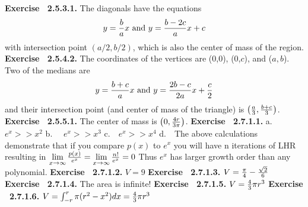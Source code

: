  {\noindent \protect \bf  Exercise ~2.5.3.1.} The diagonals have the equations $$ y=\protect \frac  {b}{a}x \protect \text  { and } y=\protect \frac  {b-2c}{a}x+c$$ with intersection point $(a/2,b/2)$, which is also the center of mass of the region. \protect \newline  \protect \newline  
 {\noindent \protect \bf  Exercise ~2.5.4.2.} The coordinates of the vertices are (0,0), (0,$c$), and ($a,b$). Two of the medians are $$y=\protect \frac  {b+c}{a}x \protect \text  { and } y=\protect \frac  {2b-c}{2a}x+\protect \frac  {c}{2}$$ and their intersection point (and center of mass of the triangle) is $\left (\protect \frac  {a}{3},\protect \frac  {b+c}{3}\right )$. \protect \newline  \protect \newline  
 {\noindent \protect \bf  Exercise ~2.5.5.1.} The center of mass is $\left ( 0, \protect \frac  {4r}{3\pi }\right )$. \protect \newline  \protect \newline  
 {\noindent \protect \bf  Exercise ~2.7.1.1.} a.~~ $e^{x}>>x^2$ b.~~ $e^{x}>>x^3$ c.~~$ e^{x}>>x^4$ d.~~The above calculations demonstrate that if you compare $p(x)$ to $e^x$ you will have n iterations of LHR resulting in $\protect \qopname  \relax m{lim}\limits _{x \to \infty }{\protect \frac  {p(x)}{e^x}}=\protect \qopname  \relax m{lim}\limits _{x \to \infty }{\protect \frac  {n!}{e^x}}=0$ Thus $e^x$ has larger growth order than any polynomial.  \protect \newline  \protect \newline  
 {\noindent \protect \bf  Exercise ~2.7.1.2.} $V=9$ \protect \newline  \protect \newline  
 {\noindent \protect \bf  Exercise ~2.7.1.3.} $V=\protect \frac  {\pi }{4} -\protect \frac  {\protect \sqrt  {2}}{6}$ \protect \newline  \protect \newline  
 {\noindent \protect \bf  Exercise ~2.7.1.4.} The area is infinite! \protect \newline  \protect \newline  
 {\noindent \protect \bf  Exercise ~2.7.1.5.} $V=\protect \frac  {4}{3} \pi r^3 $ \protect \newline  \protect \newline  
 {\noindent \protect \bf  Exercise ~2.7.1.6.} $V = \intop _{-r}^{r}{\pi (r^2-x^2) dx} = \protect \frac  {4}{3} \pi r^3 $ \protect \newline  \protect \newline  
